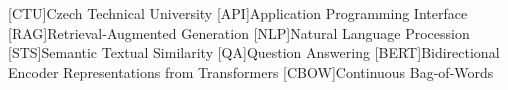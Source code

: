 
\begin{acronym}
  [CTU]{Czech Technical University}
  [API]{Application Programming Interface}
  [RAG]{Retrieval-Augmented Generation}
  [NLP]{Natural Language Procession}
  [STS]{Semantic Textual Similarity}
  [QA]{Question Answering}
  [BERT]{Bidirectional Encoder Representations from Transformers}
  [CBOW]{Continuous Bag-of-Words}
\end{acronym}
